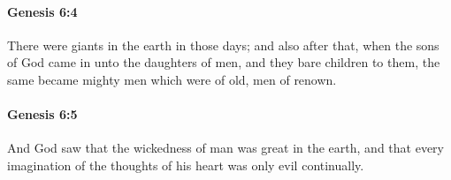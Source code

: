 		\paragraph{Genesis 6:4} %
			\label{GENESIS-6-4}

			There were giants in the earth in those days; and also after that, when the sons of God came in unto the daughters of men, and they bare children to them, the same became mighty men which were of old, men of renown.


		\paragraph{Genesis 6:5} %
			\label{GENESIS-6-5}

			And God saw that the wickedness of man was great in the earth, and that every imagination of the thoughts of his heart was only evil continually.


